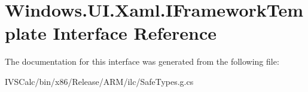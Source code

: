 \hypertarget{interface_windows_1_1_u_i_1_1_xaml_1_1_i_framework_template}{}\section{Windows.\+U\+I.\+Xaml.\+I\+Framework\+Template Interface Reference}
\label{interface_windows_1_1_u_i_1_1_xaml_1_1_i_framework_template}


The documentation for this interface was generated from the following file\+:\begin{DoxyCompactItemize}
\item 
I\+V\+S\+Calc/bin/x86/\+Release/\+A\+R\+M/ilc/Safe\+Types.\+g.\+cs\end{DoxyCompactItemize}

